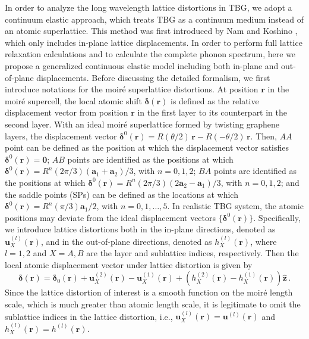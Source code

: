 \documentclass[aps,prx,10pt,twocolumn,superscriptaddress]{revtex4}
\begin{document}
In order to analyze the long wavelength lattice distortions in TBG, we adopt a continuum elastic approach, which treats TBG as a continuum medium instead of an atomic superlattice. This method was first introduced by Nam and Koshino \cite{koshino-tbg-prb17}, which only includes in-plane lattice displacements.  In order to perform full lattice relaxation calculations  and to calculate the complete phonon spectrum, here we propose a generalized continuous elastic model including both in-plane and out-of-plane displacements.  
Before discussing the detailed formalism, we first introduce notations for the moir\'e superlattice distortions. 
At position $\textbf{r}$ in the moir\'e supercell, the local atomic shift $\bm{\delta}(\textbf{r})$ is defined as the relative displacement vector  from position $\textbf{r}$ in the first layer to its counterpart in the second layer. With an ideal moir\'e superlattice formed by twisting graphene layers, the displacement vector $\bm{\delta}^{0}(\textbf{r})=R(\theta/2)\,\bm{r}-R(-\theta/2)\,\bm{r}$. Then, $AA$ point can be defined as the position at which the displacement vector satisfies $\bm{\delta}^{0}(\mathbf{r})=\mathbf{0}$; $AB$ points are identified as the positions at which  $\bm{\delta}^{0}(\textbf{r})\!=\!R^{n}(2\pi/3)(\textbf{a}_{1}+\textbf{a}_{2})/3$, with $n=0,1,2$; $BA$ points are identified as the positions at which $\bm{\delta}^{0}(\textbf{r})\!=\!R^{n}(2\pi/3)(2\textbf{a}_{2}-\textbf{a}_{1})/3$, with $n=0,1,2$; and the saddle points (SPs) can be defined as the locations at which $\bm{\delta}^{0}(\textbf{r})\!=\!R^{n}(\pi/3)\textbf{a}_{1}/2$, with $n=0,1,\dots,5$.
In realistic TBG system, the atomic positions may deviate from the ideal displacement vectors $\{\bm{\delta}^{0}(\mathbf{r})\}$. Specifically, 
we introduce lattice distortions  both in the in-plane directions, denoted as $\textbf{u}^{(l)}_{X}(\textbf{r})$, and in the out-of-plane directions, denoted as $h^{(l)}_{X}(\textbf{r})$, where $l=1,2$ and $X\!=\!A,B$ are the layer and sublattice indices, respectively.  Then the local atomic displacement vector under lattice distortion is given by 
\begin{equation}
\bm{\delta}(\textbf{r})\!=\!\bm{\delta}_{0}(\textbf{r})+\textbf{u}^{(2)}_{X}(\textbf{r})-\textbf{u}^{(1)}_{X}(\textbf{r})+(h^{(2)}_{X}(\textbf{r})-h^{(1)}_{X}(\textbf{r}))\mathbf{\hat{z}}\,.
\end{equation}
Since the lattice distortion of interest is a smooth function on the moir\'e length scale, which is much greater than atomic length scale, it is legitimate to omit the sublattice indices in the lattice distortion, i.e.,
$\textbf{u}^{(l)}_{X}(\textbf{r})\!=\!\textbf{u}^{(l)}(\textbf{r})$ and $h^{(l)}_{X}(\textbf{r})\!=\!h^{(l)}(\textbf{r})$.
\end{document}
